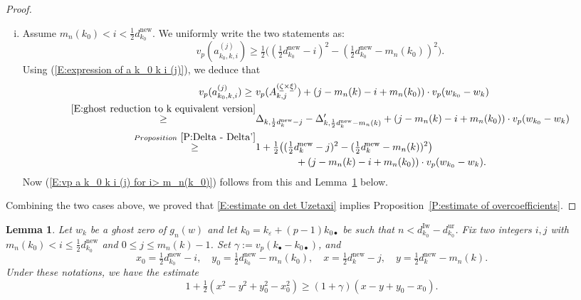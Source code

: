 \documentclass[12pt]{amsart}
\newtheorem{lemma}[subsection]{Lemma}
\theoremstyle{definition}
\numberwithin{equation}{subsection}
\newcommand{\new}{\mathrm{new}}
\newcommand{\Iw}{\mathrm{Iw}}
\newcommand{\ur}{\mathrm{ur}}
\begin{document}
\begin{proof}
\begin{enumerate}[i)]
		\item Assume $m_n(k_0)<i<\tfrac 12 d_{k_0}^\new$. We uniformly write the two statements as:
		\begin{equation}
		\label{E:vp a k_0 k i (j) for i> m_n(k_0)}
		v_p(a_{k_0,k,i}^{(j)})\geq \tfrac 12 \big((\tfrac 12 d_{k_0}^\new -i)^2-(\tfrac 12 d_{k_0}^\new -m_n(k_0))^2 \big). 
		\end{equation}
Using (\ref{E:expression of a k_0 k i (j)}), we deduce that
\begin{align*}
v_p(a_{k_0,k,i}^{(j)})\geq \ & v_p(A_{k,j}^{(\underline \zeta \times\underline\xi)}) + (j-m_n(k)-i+m_n(k_0)
) \cdot v_p(w_{k_0}-w_k)
\\
\stackrel{\eqref{E:ghost reduction to k equivalent version}}\geq & \Delta_{k, \frac 12d_k^\new - j} - \Delta'_{k, \frac 12 d_k^\new - m_n(k)} + (j-m_n(k)-i+m_n(k_0)
) \cdot v_p(w_{k_0}-w_k)
\\
\stackrel{Proposition~\ref{P:Delta - Delta'}} \geq & 1 +\tfrac 12 \big((\tfrac 12 d_k^\new -j)^2-(\tfrac 12 d_k^\new -m_n(k))^2 \big)\\
& \qquad \qquad +(j-m_n(k)-i+m_n(k_0))\cdot v_p(w_{k_0}-w_k).
\end{align*}
Now (\ref{E:vp a k_0 k i (j) for i> m_n(k_0)}) follows from this and Lemma~\ref{L:two technical inequalities involving two weights k and k_0} below. 
\end{enumerate}
Combining  the two cases above, we proved that \eqref{E:estimate on det Uzetaxi} implies Proposition~\ref{P:estimate of overcoefficients}.
\end{proof}



	

\begin{lemma}
\label{L:two technical inequalities involving two weights k and k_0}
Let $w_k$ be a ghost zero of $g_n(w)$ and let $k_0 =  k_\varepsilon + (p-1)k_{0\bullet}$ be such that $n<d_{k_0}^\Iw-d_{k_0}^\ur$. Fix two integers $i,j$ with $m_n(k_0)<i\leq \tfrac 12 d_{k_0}^\new$ and $0\leq j\leq m_n(k)-1$. Set $\gamma:=v_p(k_\bullet-k_{0\bullet})$, and
$$
x_0=\tfrac 12 d_{k_0}^\new-i, \quad y_0=\tfrac 12 d_{k_0}^\new -m_n(k_0), \quad x=\tfrac 12 d_k^\new-j, \quad y=\tfrac 12 d_k^\new -m_n(k).$$ Under these notations, we have the estimate
\begin{equation}
\label{E:inequality involving x,y,z,w, gamma when k_0 is a ghost zero}
1+\tfrac 12 (x^2-y^2+y_0^2-x_0^2)\geq (1+\gamma)(x-y +y_0-x_0).
	\end{equation}
\end{lemma}
\end{document}
